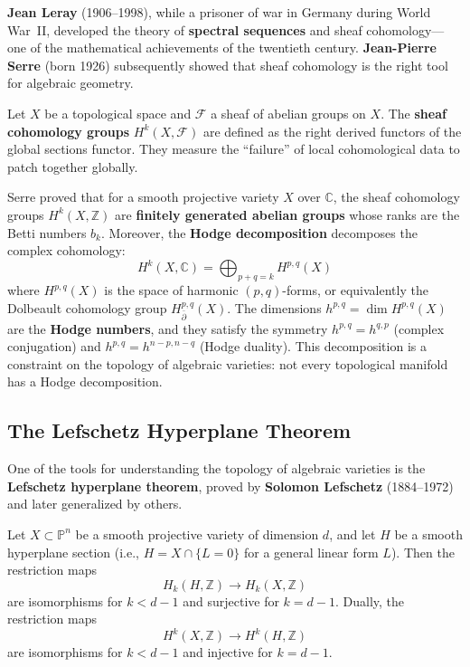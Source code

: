 \textbf{Jean Leray} (1906--1998), while a prisoner of war in Germany during World War~II, developed the theory of \textbf{spectral sequences} and sheaf cohomology---one of the mathematical achievements of the twentieth century. \textbf{Jean-Pierre Serre} (born 1926) subsequently showed that sheaf cohomology is the right tool for algebraic geometry.

\begin{definition}
Let $X$ be a topological space and $\mathcal{F}$ a sheaf of abelian groups on $X$. The \textbf{sheaf cohomology groups} $H^k(X, \mathcal{F})$ are defined as the right derived functors of the global sections functor. They measure the ``failure'' of local cohomological data to patch together globally.
\end{definition}

Serre proved that for a smooth projective variety $X$ over $\mathbb{C}$, the sheaf cohomology groups $H^k(X, \mathbb{Z})$ are \textbf{finitely generated abelian groups} whose ranks are the Betti numbers $b_k$. Moreover, the \textbf{Hodge decomposition} decomposes the complex cohomology:
\[
    H^k(X, \mathbb{C}) = \bigoplus_{p+q=k} H^{p,q}(X)
\]
where $H^{p,q}(X)$ is the space of harmonic $(p,q)$-forms, or equivalently the Dolbeault cohomology group $H^{p,q}_{\bar\partial}(X)$. The dimensions $h^{p,q} = \dim H^{p,q}(X)$ are the \textbf{Hodge numbers}, and they satisfy the symmetry $h^{p,q} = h^{q,p}$ (complex conjugation) and $h^{p,q} = h^{n-p,n-q}$ (Hodge duality). This decomposition is a constraint on the topology of algebraic varieties: not every topological manifold has a Hodge decomposition.

\subsection{The Lefschetz Hyperplane Theorem}

One of the tools for understanding the topology of algebraic varieties is the \textbf{Lefschetz hyperplane theorem}, proved by \textbf{Solomon Lefschetz} (1884--1972) and later generalized by others.

\begin{theorem}\label{thm:lefschetz}
Let $X \subset \mathbb{P}^n$ be a smooth projective variety of dimension $d$, and let $H$ be a smooth hyperplane section (i.e., $H = X \cap \{L = 0\}$ for a general linear form $L$). Then the restriction maps
\[
    H_k(H, \mathbb{Z}) \to H_k(X, \mathbb{Z})
\]
are isomorphisms for $k < d - 1$ and surjective for $k = d - 1$. Dually, the restriction maps
\[
    H^k(X, \mathbb{Z}) \to H^k(H, \mathbb{Z})
\]
are isomorphisms for $k < d - 1$ and injective for $k = d - 1$.
\end{theorem}


